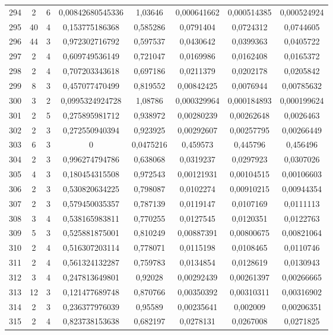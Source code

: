 \begin{longtable}{|c|c|c|c|c|c|c|c|}
294 & 2 & 6 & 0,00842680545336 & 1,03646 & 0,000641662 & 0,000514385 & 0,000524924  \\
295 & 40 & 4 & 0,153775186368 & 0,585286 & 0,0791404 & 0,0724312 & 0,0744605  \\
296 & 44 & 3 & 0,972302716792 & 0,597537 & 0,0430642 & 0,0399363 & 0,0405722  \\
297 & 2 & 4 & 0,609749536149 & 0,721047 & 0,0169986 & 0,0162408 & 0,0165372  \\
298 & 2 & 4 & 0,707203343618 & 0,697186 & 0,0211379 & 0,0202178 & 0,0205842  \\
299 & 8 & 3 & 0,457077470499 & 0,819552 & 0,00842425 & 0,0076944 & 0,00785632  \\
300 & 3 & 2 & 0,0995324924728 & 1,08786 & 0,000329964 & 0,000184893 & 0,000199624  \\
301 & 2 & 5 & 0,275895981712 & 0,938972 & 0,00280239 & 0,00262648 & 0,0026463  \\
302 & 2 & 3 & 0,272550940394 & 0,923925 & 0,00292607 & 0,00257795 & 0,00266449  \\
303 & 6 & 3 & 0 & 0,0475216 & 0,459573 & 0,445796 & 0,456496  \\
304 & 2 & 3 & 0,996274794786 & 0,638068 & 0,0319237 & 0,0297923 & 0,0307026  \\
305 & 4 & 3 & 0,180454315508 & 0,972543 & 0,00121931 & 0,00104515 & 0,00106603  \\
306 & 2 & 3 & 0,530820634225 & 0,798087 & 0,0102274 & 0,00910215 & 0,00944354  \\
307 & 2 & 3 & 0,579450035357 & 0,787139 & 0,0119147 & 0,0107169 & 0,0111113  \\
308 & 3 & 4 & 0,538165983811 & 0,770255 & 0,0127545 & 0,0120351 & 0,0122763  \\
309 & 5 & 3 & 0,525881875001 & 0,810249 & 0,00887391 & 0,00800675 & 0,00821064  \\
310 & 2 & 4 & 0,516307203114 & 0,778071 & 0,0115198 & 0,0108465 & 0,0110746  \\
311 & 2 & 4 & 0,561324132287 & 0,759783 & 0,0134854 & 0,0128619 & 0,0130943  \\
312 & 3 & 4 & 0,247813649801 & 0,92028 & 0,00292439 & 0,00261397 & 0,00266665  \\
313 & 12 & 3 & 0,121477689748 & 0,870766 & 0,00350392 & 0,00310311 & 0,00316902  \\
314 & 2 & 3 & 0,236377976039 & 0,95589 & 0,00235641 & 0,002009 & 0,00206351  \\
315 & 2 & 4 & 0,823738153638 & 0,682197 & 0,0278131 & 0,0267008 & 0,0271825  \\

\end{longtable}
